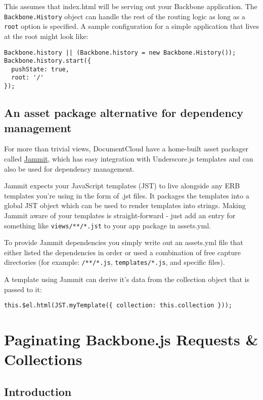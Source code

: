 \documentclass[9pt]{book}
\begin{document}
This assumes that index.html will be serving out your Backbone
application. The \texttt{Backbone.History} object can handle the rest of
the routing logic as long as a \texttt{root} option is specified. A
sample configuration for a simple application that lives at the root
might look like:

\begin{verbatim}
Backbone.history || (Backbone.history = new Backbone.History());
Backbone.history.start({
  pushState: true,
  root: '/'
});
\end{verbatim}

\subsection{An asset package alternative for dependency
management}\label{an-asset-package-alternative-for-dependency-management}

For more than trivial views, DocumentCloud have a home-built asset
packager called \href{https://github.com/documentcloud/jammit}{Jammit},
which has easy integration with Underscore.js templates and can also be
used for dependency management.

Jammit expects your JavaScript templates (JST) to live alongside any ERB
templates you're using in the form of .jst files. It packages the
templates into a global JST object which can be used to render templates
into strings. Making Jammit aware of your templates is straight-forward
- just add an entry for something like \texttt{views/**/*.jst} to your
app package in assets.yml.

To provide Jammit dependencies you simply write out an assets.yml file
that either listed the dependencies in order or used a combination of
free capture directories (for example: \texttt{/**/*.js},
\texttt{templates/*.js}, and specific files).

A template using Jammit can derive it's data from the collection object
that is passed to it:

\begin{verbatim}
this.$el.html(JST.myTemplate({ collection: this.collection }));
\end{verbatim}

\section{Paginating Backbone.js Requests \&
Collections}\label{paginating-backbone.js-requests-collections}

\subsection{Introduction}\label{introduction-2}
\end{document}
